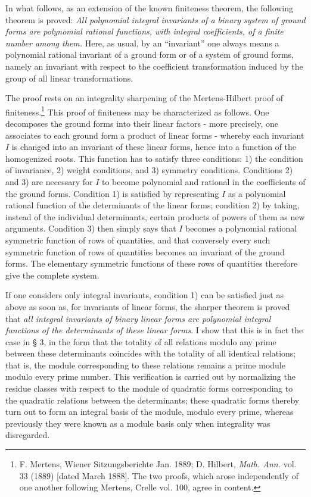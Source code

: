 \documentclass[11pt]{article}
\begin{document}
In what follows, as an extension of the known finiteness theorem, the following theorem is proved:
\emph{All polynomial integral invariants of a binary system of ground forms are polynomial rational functions, with integral coefficients, of a finite number among them.}
Here, as usual, by an ``invariant'' one always means a polynomial rational invariant of a ground form or of a system of ground forms, namely an invariant with respect to the coefficient transformation induced by the group of all linear transformations.

The proof rests on an integrality sharpening of the Mertens-Hilbert proof of finiteness.\footnote{F. Mertens, Wiener Sitzungsberichte Jan. 1889; D. Hilbert, \emph{Math. Ann.} vol. 33 (1889) [dated March 1888]. The two proofs, which arose independently of one another following Mertens, Crelle vol. 100, agree in content.}
This proof of finiteness may be characterized as follows. One decomposes the ground forms into their linear factors - more precisely, one associates to each ground form a product of linear forms - whereby each invariant \(I\) is changed into an invariant of these linear forms, hence into a function of the homogenized roots. This function has to satisfy three conditions: 1) the condition of invariance, 2) weight conditions, and 3) symmetry conditions. Conditions 2) and 3) are necessary for \(I\) to become polynomial and rational in the coefficients of the ground forms. Condition 1) is satisfied by representing \(I\) as a polynomial rational function of the determinants of the linear forms; condition 2) by taking, instead of the individual determinants, certain products of powers of them as new arguments. Condition 3) then simply says that \(I\) becomes a polynomial rational symmetric function of rows of quantities, and that conversely every such symmetric function of rows of quantities becomes an invariant of the ground forms. The elementary symmetric functions of these rows of quantities therefore give the complete system.

If one considers only integral invariants, condition 1) can be satisfied just as above as soon as, for invariants of linear forms, the sharper theorem is proved that \emph{all integral invariants of binary linear forms are polynomial integral functions of the determinants of these linear forms}. I show that this is in fact the case in § 3, in the form that the totality of all relations modulo any prime between these determinants coincides with the totality of all identical relations; that is, the module corresponding to these relations remains a prime module modulo every prime number. This verification is carried out by normalizing the residue classes with respect to the module of quadratic forms corresponding to the quadratic relations between the determinants; these quadratic forms thereby turn out to form an integral basis of the module, modulo every prime, whereas previously they were known as a module basis only when integrality was disregarded.
\end{document}

